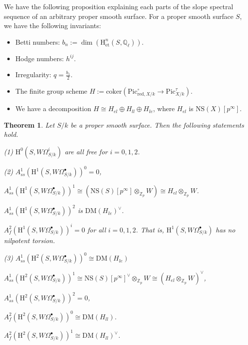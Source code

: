\documentclass[a4paper,12pt,twoside]{report}
\newtheorem{theorem}{Theorem}[section]
\newcommand{\Q}{\mathbb{Q}}
\newcommand{\Z}{\mathbb{Z}}
\newcommand{\et}{\mathrm{\acute{e}t}}
\newcommand{\Pic}{\mathrm{Pic}}
\newcommand{\NS}{\mathrm{NS}}
\newcommand{\HH}{\mathrm{H}}
\newcommand{\DM}{\mathrm{DM}}
\newcommand{\red}{\mathrm{red}}
\begin{document}
We have the following proposition explaining each parts of the slope spectral sequence of an arbitrary 
proper smooth surface. For a proper smooth surface $S$, we have the following invariants: 
\begin{itemize}
    \item Betti numbers: $b_n:=\dim(\HH^n_{\et}(S,\Q_{\ell}))$.
    \item Hodge numbers: $h^{ij}$.
    \item Irregularity: $q=\frac{b_1}{2}$.
    \item The finite group scheme $H:=\mathrm{coker}(\Pic_{\red,X/k}^\circ\rightarrow \Pic_{X/k}^\tau)$. 
    \item We have a decomposition $H\cong H_{el}\oplus H_{ll}\oplus H_{le}$, where $H_{el}$ is $\NS(X)[p^\infty]$. 
\end{itemize}


\begin{theorem}\label{surfacesparts}
    Let $S/k$ be a proper smooth surface. Then the following statements hold.

{\rm (1)} $\HH^0(S,W\Omega^i_{S/k})$ are all free for $i=0,1,2$. 

{\rm (2)} $A^1_{ss}(\HH^1(S,W\Omega^\bullet_{S/k}))^0=0$, 

\indent\indent\indent $A^1_{ss}(\HH^1(S,W\Omega^\bullet_{S/k}))^1\cong(\NS(S)[p^\infty]\otimes_{\Z_p}W)\cong H_{el}\otimes_{\Z_p}W$.  

\indent\indent\indent $A^1_{ss}(\HH^1(S,W\Omega^\bullet_{S/k}))^2$ is $\DM(H_{le})^\vee$. 

\indent\indent\indent $A^2_{f}(\HH^1(S,W\Omega^\bullet_{S/k}))^i=0$ for all $i=0,1,2$. 
That is, $\HH^1(S,W\Omega^\bullet_{S/k})$ has no nilpotent torsion. 

{\rm (3)} $A^1_{ss}(\HH^2(S,W\Omega^\bullet_{S/k}))^0\cong\DM(H_{le})$ 

\indent\indent\indent $A^1_{ss}(\HH^2(S,W\Omega^\bullet_{S/k}))^1\cong\NS(S)[p^\infty]^\vee\otimes_{\Z_p}W\cong(H_{el}\otimes_{\Z_p}W)^\vee$,

\indent\indent\indent $A^1_{ss}(\HH^2(S,W\Omega^\bullet_{S/k}))^2=0$,

\indent\indent\indent $A^2_{f}(\HH^2(S,W\Omega^\bullet_{S/k}))^0\cong\DM(H_{ll})$. 

\indent\indent\indent $A^2_{f}(\HH^2(S,W\Omega^\bullet_{S/k}))^1\cong\DM(H_{ll})^\vee$. 

\end{theorem}
\end{document}
